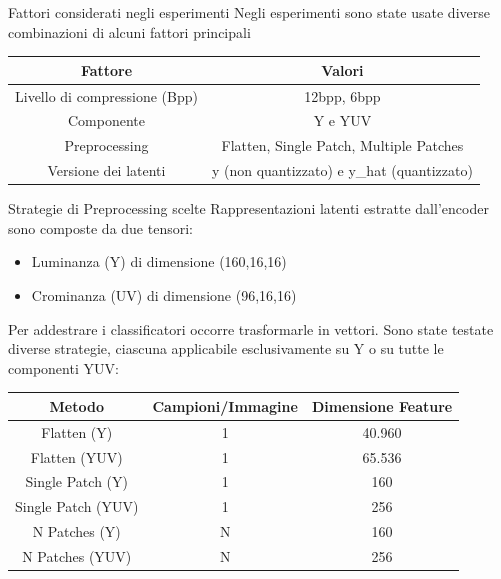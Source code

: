 \documentclass[11pt]{beamer}
\begin{document}
\begin{frame}{Fattori considerati negli esperimenti}
Negli esperimenti sono state usate diverse combinazioni di alcuni fattori principali
\begin{table}[h]
    \centering
    \begin{tabular}{cc}
        \toprule
        \textbf{Fattore} & \textbf{Valori} \\
        \midrule
        Livello di compressione (Bpp) & 12bpp, 6bpp \\
        \midrule
        Componente & Y e YUV \\
        \midrule
        Preprocessing & Flatten, Single Patch, Multiple Patches \\
        \midrule
        Versione dei latenti & y (non quantizzato) e y\_hat (quantizzato) \\
        \bottomrule
    \end{tabular}
\end{table}
\end{frame}
\begin{frame}{Strategie di Preprocessing scelte}
Rappresentazioni latenti estratte dall'encoder sono composte da due tensori:
\begin{itemize}
    \item Luminanza (Y) di dimensione (160,16,16)
    \item Crominanza (UV) di dimensione (96,16,16)
\end{itemize}
\vspace{0.15cm}
Per addestrare i classificatori occorre trasformarle in vettori. Sono state testate diverse strategie, ciascuna applicabile esclusivamente su Y o su tutte le componenti YUV:
\vspace{0.1cm}
    \begin{table}[h]
        \centering
        \begin{tabular}{ccc}
            \toprule
            \textbf{Metodo} & \textbf{Campioni/Immagine} & \textbf{Dimensione Feature} \\
            \midrule
            Flatten (Y) & 1 & 40.960 \\
            Flatten (YUV) & 1 & 65.536 \\
            Single Patch (Y) & 1 & 160 \\
            Single Patch (YUV) & 1 & 256 \\
            N Patches (Y) & N & 160 \\
            N Patches (YUV) & N & 256 \\
            \bottomrule
        \end{tabular}
    \end{table}
\end{frame}
\end{document}
